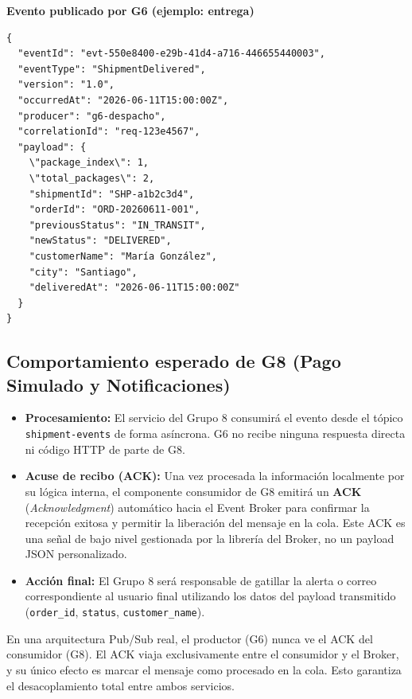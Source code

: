 \documentclass[11pt, a4paper]{article}
\newcommand{\contractheader}[1]{%
  \noindent\colorbox{primary!10}{%
    \parbox{\dimexpr\textwidth-2\fboxsep}{%
      \textbf{\faFileCode\quad #1}%
    }%
  }
  \vspace{0.3cm}
}
\begin{document}
\contractheader{Evento publicado por G6 (ejemplo: entrega)}

\begin{lstlisting}
{
  "eventId": "evt-550e8400-e29b-41d4-a716-446655440003",
  "eventType": "ShipmentDelivered",
  "version": "1.0",
  "occurredAt": "2026-06-11T15:00:00Z",
  "producer": "g6-despacho",
  "correlationId": "req-123e4567",
  "payload": {
    \"package_index\": 1,
    \"total_packages\": 2,
    "shipmentId": "SHP-a1b2c3d4",
    "orderId": "ORD-20260611-001",
    "previousStatus": "IN_TRANSIT",
    "newStatus": "DELIVERED",
    "customerName": "María González",
    "city": "Santiago",
    "deliveredAt": "2026-06-11T15:00:00Z"
  }
}
\end{lstlisting}

\subsection{Comportamiento esperado de G8 (Pago Simulado y Notificaciones)}

\begin{itemize}[noitemsep]
  \item \textbf{Procesamiento:} El servicio del Grupo 8 consumirá el evento
    desde el tópico \texttt{shipment-events} de forma asíncrona. G6 no recibe
    ninguna respuesta directa ni código HTTP de parte de G8.
  \item \textbf{Acuse de recibo (ACK):} Una vez procesada la información
    localmente por su lógica interna, el componente consumidor de G8 emitirá un
    \textbf{ACK} (\textit{Acknowledgment}) automático hacia el Event Broker para
    confirmar la recepción exitosa y permitir la liberación del mensaje en la
    cola. Este ACK es una señal de bajo nivel gestionada por la librería del
    Broker, no un payload JSON personalizado.
  \item \textbf{Acción final:} El Grupo 8 será responsable de gatillar la
    alerta o correo correspondiente al usuario final utilizando los datos del
    payload transmitido (\texttt{order\_id}, \texttt{status},
    \texttt{customer\_name}).
\end{itemize}

\begin{infobox}
  En una arquitectura Pub/Sub real, el productor (G6) nunca ve el ACK del
  consumidor (G8). El ACK viaja exclusivamente entre el consumidor y el
  Broker, y su único efecto es marcar el mensaje como procesado en la cola.
  Esto garantiza el desacoplamiento total entre ambos servicios.
\end{infobox}
\end{document}
